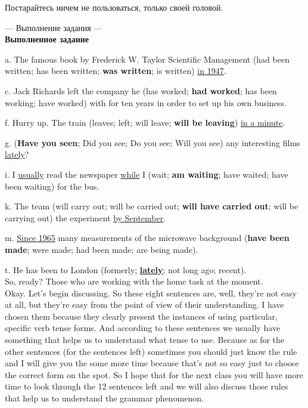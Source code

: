 \documentclass[main.tex]{subfiles}
\begin{document}
Постарайтесь ничем не пользоваться, только своей головой.

\newpage
{}

--- Выполнение задания ---
\\

\textbf{Выполненное задание}

a. The famous book by Frederick W. Taylor Scientific Management (had been written; has been written; \textbf{was written}; is written) \underline{in 1947}.

c. Jack Richards left the company he (has worked; \textbf{had worked}; has been working; have worked) with for ten years in order to set up his own business.

f. Hurry up. The train (leaves; left; will leave; \textbf{will be leaving}) \underline{in a minute}.

g. (\textbf{Have you seen}; Did you see; Do you see; Will you see) any interesting films \underline{lately}?

i. I \underline{usually} read the newspaper \underline{while} I (wait; \textbf{am waiting}; have waited; have been waiting) for the bus.

k. The team (will carry out; will be carried out; \textbf{will have carried out}; will be carrying out) the experiment \underline{by September}.

m. \underline{Since 1965} many measurements of the microwave background (\textbf{have been made}; were made; had been made; are being made).

t. He has been to London (formerly; \underline{\textbf{lately}}; not long ago; recent).
\\
 

So, ready? Those who are working with the home task at the moment.
\\

Okay.
Let's begin discussing.
So these eight sentences are, well, they're not easy at all, but they're easy from the point of view of their understanding.
I have chosen them because they clearly present the instances of using particular, specific verb tense forms.
And according to these sentences we usually have something that helps us to understand what tense to use.
Because as for the other sentences (for the sentences left) sometimes you should just know the rule and I will give you the some more time because that's not so easy just to choose the correct form on the spot.
So I hope that for the next class you will have more time to look through the 12 sentences left and we will also discuss those rules that help us to understand the grammar phenomenon.
\end{document}
